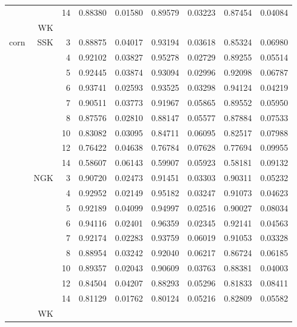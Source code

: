 \documentclass{article}
\theoremstyle{definition}
\begin{document}
\begin{table}[]
\begin{tabular}{|l|r|r|r|r|r|r|r|r|}
   &   & 14  &0.88380 &0.01580 &0.89579 &0.03223 &0.87454 &0.04084\\ \cline{2-9} 
   & WK  &   &   & &   & &   & \\ \hline
\multirow{19}{*}{corn}    
   & SSK & 3 &0.88875  &0.04017  &0.93194  &0.03618  &0.85324  &0.06980\\
   &   & 4   &0.92102  &0.03827  &0.95278  &0.02729  &0.89255  &0.05514\\
   &   & 5   &0.92445  &0.03874  &0.93094  &0.02996  &0.92098  &0.06787\\
   &   & 6   &0.93741  &0.02593  &0.93525  &0.03298  &0.94124  &0.04219\\
   &   & 7   &0.90511  &0.03773  &0.91967  &0.05865  &0.89552  &0.05950\\
   &   & 8   &0.87576  &0.02810  &0.88147  &0.05577  &0.87884  &0.07533\\
   &   & 10  &0.83082  &0.03095  &0.84711  &0.06095  &0.82517  &0.07988\\
   &   & 12  &0.76422  &0.04638  &0.76784  &0.07628  &0.77694  &0.09955\\
   &   & 14  &0.58607  &0.06143  &0.59907  &0.05923  &0.58181  &0.09132\\ \cline{2-9} 
   & NGK & 3   &0.90720 &0.02473 &0.91451 &0.03303 &0.90311 &0.05232\\
   &   & 4   &0.92952 &0.02149 &0.95182 &0.03247 &0.91073 &0.04623\\
   &   & 5   &0.92189 &0.04099 &0.94997 &0.02516 &0.90027 &0.08034\\
   &   & 6   &0.94116 &0.02401 &0.96359 &0.02345 &0.92141 &0.04563\\
   &   & 7   &0.92174 &0.02283 &0.93759 &0.06019 &0.91053 &0.03328\\
   &   & 8   &0.88954 &0.03242 &0.92040 &0.06217 &0.86724 &0.06185\\
   &   & 10  &0.89357 &0.02043 &0.90609 &0.03763 &0.88381 &0.04003\\
   &   & 12  &0.84504 &0.04207 &0.88293 &0.05296 &0.81833 &0.08411\\
   &   & 14  &0.81129 &0.01762 &0.80124 &0.05216 &0.82809 &0.05582\\ \cline{2-9} 
   & WK  &   &   & &   & &   & \\ \hline
\end{tabular}
\end{table}
\end{document}
